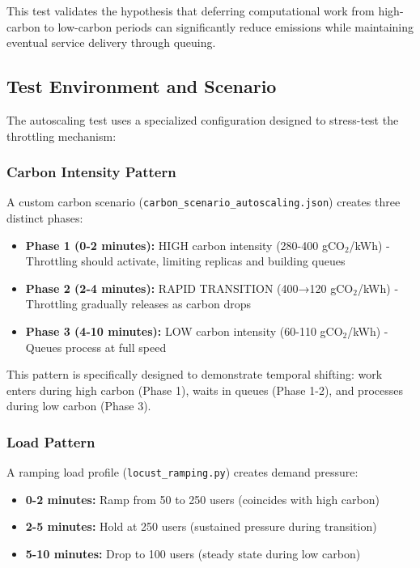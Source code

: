 This test validates the hypothesis that deferring computational work from high-carbon to low-carbon periods can significantly reduce emissions while maintaining eventual service delivery through queuing.

\subsection{Test Environment and Scenario}

The autoscaling test uses a specialized configuration designed to stress-test the throttling mechanism:

\subsubsection{Carbon Intensity Pattern}

A custom carbon scenario (\texttt{carbon\_scenario\_autoscaling.json}) creates three distinct phases:

\begin{itemize}
    \item \textbf{Phase 1 (0-2 minutes):} HIGH carbon intensity (280-400 gCO$_2$/kWh) - Throttling should activate, limiting replicas and building queues
    \item \textbf{Phase 2 (2-4 minutes):} RAPID TRANSITION (400→120 gCO$_2$/kWh) - Throttling gradually releases as carbon drops
    \item \textbf{Phase 3 (4-10 minutes):} LOW carbon intensity (60-110 gCO$_2$/kWh) - Queues process at full speed
\end{itemize}

This pattern is specifically designed to demonstrate temporal shifting: work enters during high carbon (Phase 1), waits in queues (Phase 1-2), and processes during low carbon (Phase 3).

\subsubsection{Load Pattern}

A ramping load profile (\texttt{locust\_ramping.py}) creates demand pressure:

\begin{itemize}
    \item \textbf{0-2 minutes:} Ramp from 50 to 250 users (coincides with high carbon)
    \item \textbf{2-5 minutes:} Hold at 250 users (sustained pressure during transition)
    \item \textbf{5-10 minutes:} Drop to 100 users (steady state during low carbon)
\end{itemize}

